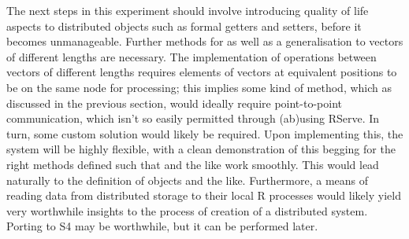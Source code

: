 The next steps in this experiment should involve introducing quality of
life aspects to distributed objects such as formal getters and setters,
before it becomes unmanageable. Further methods for
 as well as a generalisation to vectors of
different lengths are necessary. The implementation of operations
between vectors of different lengths requires elements of vectors at
equivalent positions to be on the same node for processing; this implies
some kind of  method, which as discussed in the previous
section, would ideally require point-to-point communication, which isn't
so easily permitted through (ab)using RServe. In turn, some custom
solution would likely be required. Upon implementing this, the system
will be highly flexible, with a clean demonstration of this begging for
the right methods defined such that  and the like work
smoothly. This would lead naturally to the definition of
 objects and the like. Furthermore, a
means of reading data from distributed storage to their local R
processes would likely yield very worthwhile insights to the process of
creation of a distributed \R system. Porting to S4 may be worthwhile, but
it can be performed later.
